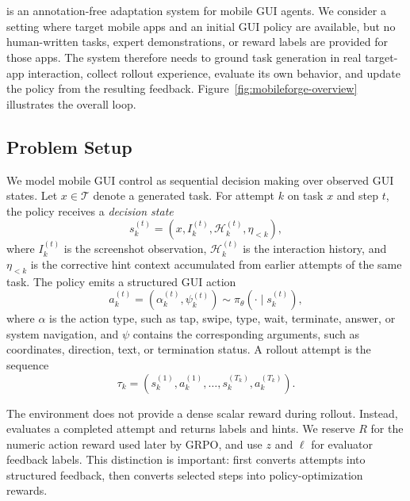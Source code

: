 \section{\ourmethod}
\label{sec:method}

\ourmethod is an annotation-free adaptation system for mobile GUI agents. We consider a setting where target mobile apps and an initial GUI policy are available, but no human-written tasks, expert demonstrations, or reward labels are provided for those apps. The system therefore needs to ground task generation in real target-app interaction, collect rollout experience, evaluate its own behavior, and update the policy from the resulting feedback. Figure~\ref{fig:mobileforge-overview} illustrates the overall loop.



\subsection{Problem Setup}

We model mobile GUI control as sequential decision making over observed GUI states. Let $x\in\mathcal{T}$ denote a generated task. For attempt $k$ on task $x$ and step $t$, the policy receives a \emph{decision state}
\begin{equation}
\label{eq:decision-state}
    s_k^{(t)}=(x,I_k^{(t)},\mathcal{H}_k^{(t)},\eta_{<k}),
\end{equation}
where $I_k^{(t)}$ is the screenshot observation, $\mathcal{H}_k^{(t)}$ is the interaction history, and $\eta_{<k}$ is the corrective hint context accumulated from earlier attempts of the same task. The policy emits a structured GUI action
\begin{equation}
\label{eq:gui-action}
    a_k^{(t)}=(\alpha_k^{(t)},\psi_k^{(t)})
    \sim \pi_\theta(\cdot\mid s_k^{(t)}),
\end{equation}
where $\alpha$ is the action type, such as tap, swipe, type, wait, terminate, answer, or system navigation, and $\psi$ contains the corresponding arguments, such as coordinates, direction, text, or termination status. A rollout attempt is the sequence
\begin{equation}
\label{eq:trajectory}
    \tau_k=(s_k^{(1)},a_k^{(1)},\ldots,s_k^{(T_k)},a_k^{(T_k)}).
\end{equation}

The environment does not provide a dense scalar reward during rollout. Instead, \critic evaluates a completed attempt and returns labels and hints. We reserve $R$ for the numeric action reward used later by GRPO, and use $z$ and $\ell$ for evaluator feedback labels. This distinction is important: \ourmethod first converts attempts into structured feedback, then converts selected steps into policy-optimization rewards.

